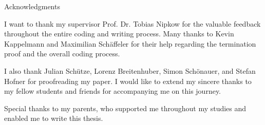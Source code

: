 \thispagestyle{empty}

\vspace*{20mm}

\begin{center}
    { Acknowledgments}
\end{center}

\vspace{10mm}

I want to thank my supervisor Prof. Dr. Tobias Nipkow for the valuable feedback throughout the entire coding and writing process.
Many thanks to Kevin Kappelmann and Maximilian Schäffeler for their help regarding the termination proof and the overall coding process.

I also thank Julian Schütze, Lorenz Breitenhuber, Simon Schönauer, and Stefan Hofner for proofreading my paper.
I would like to extend my sincere thanks to my fellow students and friends for accompanying me on this journey.

Special thanks to my parents, who supported me throughout my studies and enabled me to write this thesis.

\cleardoublepage{}
